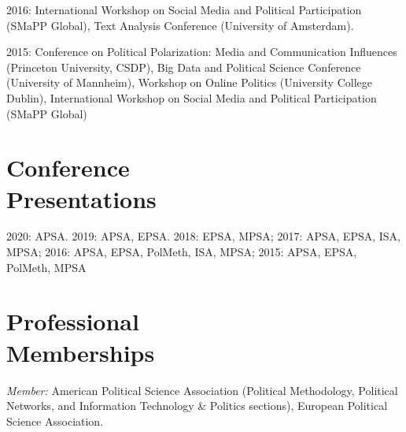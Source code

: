 \documentclass[margin,line,11pt]{resume}
\newcommand{\nl}{\vspace{0.10in}\\}
\begin{document}
\begin{resume}
2016: International Workshop on Social Media and Political Participation (SMaPP Global), Text Analysis Conference (University of Amsterdam).

2015: Conference on Political Polarization: Media and Communication Influences (Princeton University, CSDP), Big Data and Political Science Conference (University of Mannheim), Workshop on Online Politics (University College Dublin), International Workshop on Social Media and Political Participation (SMaPP Global)

        \section{\mysidestyle Conference\\Presentations}
        
2020: APSA. 2019: APSA, EPSA. 2018: EPSA, MPSA; 2017: APSA, EPSA, ISA, MPSA; 2016: APSA, EPSA, PolMeth, ISA, MPSA; 2015: APSA, EPSA, PolMeth, MPSA


\section{\mysidestyle Professional\\Memberships}

\emph{Member:} American Political Science Association (Political Methodology, Political Networks, and Information Technology \& Politics sections), European Political Science Association.


   
    
    


\end{resume}
\end{document}

